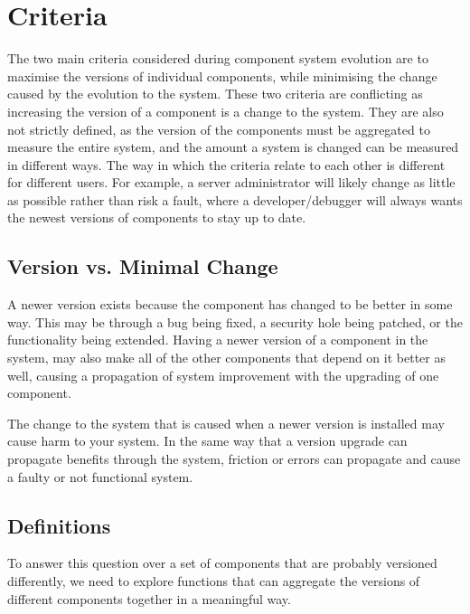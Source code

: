 \section{Criteria}
The two main criteria considered during component system evolution are to maximise the versions of individual components, 
while minimising the change caused by the evolution to the system. 
These two criteria are conflicting as increasing the version of a component is a change to the system.
They are also not strictly defined, as the version of the components must be aggregated to measure the entire system,
and the amount a system is changed can be measured in different ways.
The way in which the criteria relate to each other is different for different users.
For example, a server administrator will likely change as little as possible rather than risk a fault, 
where a developer/debugger will always wants the newest versions of components to stay up to date.

\subsection{Version vs. Minimal Change}

A newer version exists because the component has changed to be better in some way.
This may be through a bug being fixed, a security hole being patched, or the functionality being extended.
Having a newer version of a component in the system, may also make all of the other components that depend on it better as well,
causing a propagation of system improvement with the upgrading of one component.


The change to the system that is caused when a newer version is installed may cause harm to your system.
In the same way that a version upgrade can propagate benefits through the system, 
friction or errors can propagate and cause a faulty or not functional system.

\subsection{Definitions}

To answer this question over a set of components that are probably versioned differently, 
we need to explore functions that can aggregate the versions of different components together in a meaningful way.

